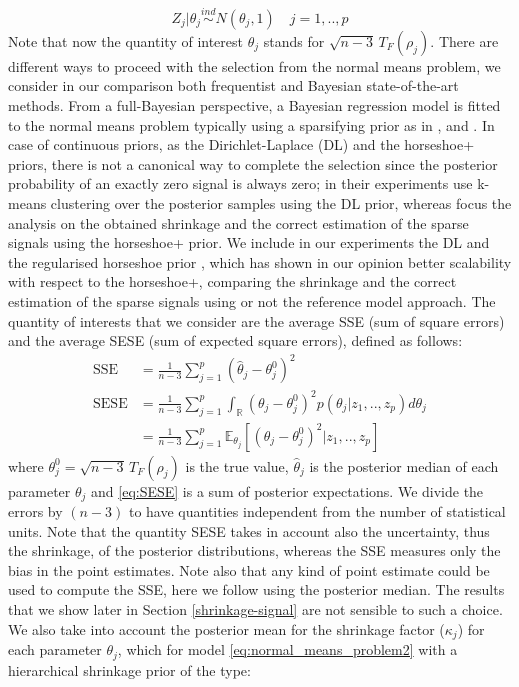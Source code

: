 \documentclass[american,]{article}
\theoremstyle{definition}
\begin{document}
\
\begin{equation} \label{eq:normal_means_problem2}
Z_{j}|\theta_{j}\overset{ind}{\sim}N(\theta_{j},1) \quad j=1,..,p
\end{equation}
Note that now the quantity of interest $\theta_{j}$ stands for $\sqrt{n-3}\,T_{F}(\rho_{j})$. There are different ways to proceed with the selection from the normal means problem, we consider in our comparison both frequentist and Bayesian state-of-the-art methods. From a full-Bayesian perspective, a Bayesian regression model is fitted to the normal means problem typically using a sparsifying prior as in \cite{paper:dirichlet_laplace}, \cite{bhadra2017horseshoe+} and \cite{johnstone2004needles}. In case of continuous priors, as the Dirichlet-Laplace (DL) and the horseshoe+ priors, there is not a canonical way to complete the selection since the posterior probability of an exactly zero signal is always zero; in their experiments \cite{paper:dirichlet_laplace} use k-means clustering over the posterior samples using the DL prior, whereas \cite{bhadra2017horseshoe+} focus the analysis on the obtained shrinkage and the correct estimation of the sparse signals using the horseshoe+ prior. We include in our experiments the DL and the regularised horseshoe prior \citep{paper:rhs}, which has shown in our opinion better scalability with respect to the horseshoe+, comparing the shrinkage and the correct estimation of the sparse signals using or not the reference model approach. The quantity of interests that we consider are the average SSE (sum of square errors) and the average SESE (sum of expected square errors), defined as follows:
\
\begin{align}
\text{SSE}&=\frac{1}{n-3}\sum_{j=1}^{p}(\hat{\theta}_{j} - \theta^{0}_{j})^{2} \label{eq:SSE} \\
\text{SESE}&=\frac{1}{n-3}\sum_{j=1}^{p}\int_{\mathbb{R}}(\theta_{j}-\theta^{0}_{j})^{2}p(\theta_{j}|z_{1},..,z_{p})d\theta_{j} \\
&=\frac{1}{n-3}\sum_{j=1}^{p}\mathbb{E}_{\theta_{j}}[(\theta_{j}-\theta^{0}_{j})^{2}|z_{1},..,z_{p}] \label{eq:SESE}
\end{align}
where $\theta_{j}^{0}=\sqrt{n-3}\,T_{F}(\rho_{j})$ is the true value, $\hat{\theta}_{j}$ is the posterior median of each parameter $\theta_{j}$ and \eqref{eq:SESE} is a sum of posterior expectations. We divide the errors by $(n-3)$ to have quantities independent from the number of statistical units. Note that the quantity SESE takes in account also the uncertainty, thus the shrinkage, of the posterior distributions, whereas the SSE measures only the bias in the point estimates. Note also that any kind of point estimate could be used to compute the SSE, here we follow \cite{paper:dirichlet_laplace} using the posterior median. The results that we show later in Section \ref{shrinkage-signal} are not sensible to such a choice. We also take into account the posterior mean for the shrinkage factor ($\kappa_{j}$) for each parameter $\theta_{j}$, which for model \eqref{eq:normal_means_problem2} with a hierarchical shrinkage prior of the type:
\end{document}
